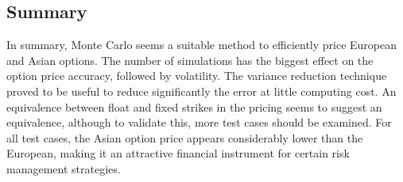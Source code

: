 \documentclass{article}
\begin{document}
    \subsection{Summary}\label{summary}

In summary, Monte Carlo seems a suitable method to efficiently price European
and Asian options. The number of simulations has the biggest effect on
the option price accuracy, followed by volatility. The variance
reduction technique proved to be useful to reduce significantly the
error at little computing cost. An equivalence between float and fixed
strikes in the pricing seems to suggest an equivalence, although to
validate this, more test cases should be examined. For all test cases,
the Asian option price appears considerably lower than the European,
making it an attractive financial instrument for certain risk management
strategies.


    
    
    
    
\end{document}
